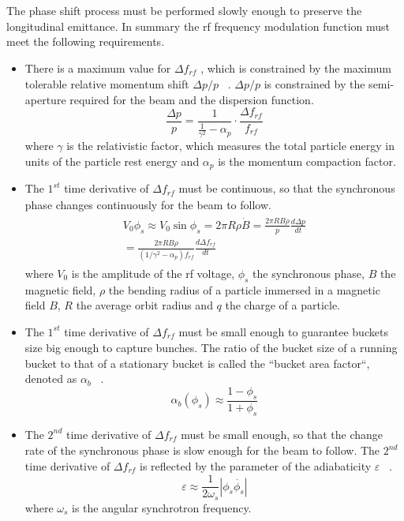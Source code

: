 The phase shift process must be performed slowly enough to preserve the longitudinal emittance. In summary the rf frequency modulation function must meet the following requirements.   
\begin{itemize}
	\item There is a maximum value for $\Delta f_\mathit{rf}$ , which is constrained by the maximum tolerable relative momentum shift $\Delta p/p$ ~\cite{bovet_selection_1970}. $\Delta p/p$ is constrained by the semi-aperture required for the beam and the dispersion function. 
\begin{equation}
\frac{\Delta{p}}{p}  = \frac{1}{\frac{1}{\gamma^2}-\alpha_{\mathit{p}}}\cdot \frac{\Delta f_{\mathit{rf}}}{f_{\mathit{rf}}}
\label{eq:phaseP11}
\end{equation}
where $\gamma$ is the relativistic factor, which measures the total particle energy in units of the particle rest energy and $\alpha_{\mathit{p}}$ is the momentum compaction factor.

	\item The $1^\mathit{st}$ time derivative of $\Delta f_\mathit{rf}$ must be continuous, so that the synchronous phase changes continuously for the beam to follow. 
\begin{eqnarray}
\begin{aligned}
	V_0\phi_s\approx V_0\sin\phi_s=2\pi R\rho\dot{B}=\frac{2\pi R B\rho}{p} \frac{d \Delta p}{dt}\\=\frac{2\pi R B\rho}{(1/\gamma^2-\alpha_p)f_\mathit{rf}} \frac{d \Delta f_\mathit{rf}}{dt}\label{eq2}
\end{aligned}
\end{eqnarray}
where $V_0$ is the amplitude of the rf voltage, $\phi_s$ the synchronous phase, $B$ the magnetic field, $\rho$ the bending radius of a particle immersed in a magnetic field $B$, $R$ the average orbit radius and $q$ the charge of a particle.
	\item The $1^\mathit{st}$ time derivative of $\Delta f_\mathit{rf}$ must be small enough to guarantee buckets size big enough to capture bunches. 
The ratio of the bucket size of a running bucket to that of a stationary bucket is called the ``bucket area factor``, denoted as $\alpha_b$ ~\cite{lee_accelerator_2011}.
\begin{equation} 
\label{bucket_size}
\alpha_b(\phi_{s})\approx \frac{1-\phi_{s}}{1+\phi_{s}}
\end{equation} 
	\item The $2^\mathit{nd}$ time derivative of $\Delta f_\mathit{rf}$ must be small enough, so that the change rate of the synchronous phase is slow enough for the beam to follow. The $2^\mathit{nd}$ time derivative of $\Delta f_\mathit{rf}$ is reflected by the parameter of the adiabaticity $\varepsilon$ ~\cite{ezura_beam-dynamics_2008}.
\begin{equation}
\varepsilon \approx \frac{1}{2\omega_s}|\phi_s\dot{\phi_{s}}|
\label{eq:derivation1}
\end{equation} 
where $\omega_s$ is the angular synchrotron frequency.
\end{itemize}

